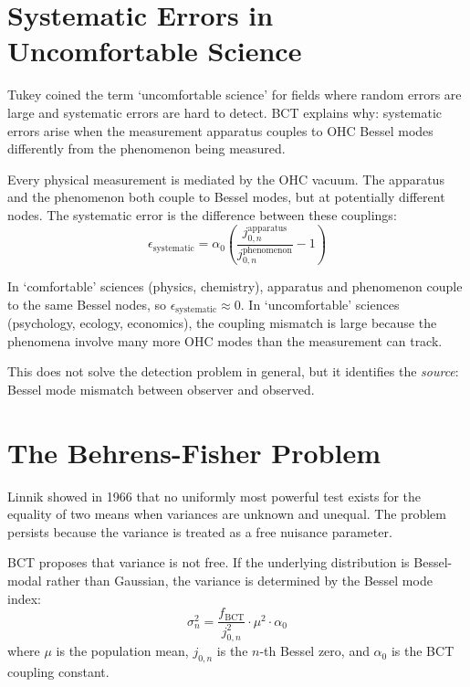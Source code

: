 \documentclass[aps,prl,twocolumn,superscriptaddress]{revtex4-2}
\begin{document}
\section{Systematic Errors in Uncomfortable Science}

Tukey coined the term `uncomfortable science' for fields where random errors are large and systematic errors are hard to detect. BCT explains why: systematic errors arise when the measurement apparatus couples to OHC Bessel modes differently from the phenomenon being measured.

Every physical measurement is mediated by the OHC vacuum. The apparatus and the phenomenon both couple to Bessel modes, but at potentially different nodes. The systematic error is the difference between these couplings:
\begin{equation}
\epsilon_{\mathrm{systematic}} = \alpha_0 \left(\frac{j_{0,n}^{\mathrm{apparatus}}}{j_{0,n}^{\mathrm{phenomenon}}} - 1\right)
\end{equation}

In `comfortable' sciences (physics, chemistry), apparatus and phenomenon couple to the same Bessel nodes, so $\epsilon_{\mathrm{systematic}} \approx 0$. In `uncomfortable' sciences (psychology, ecology, economics), the coupling mismatch is large because the phenomena involve many more OHC modes than the measurement can track.

This does not solve the detection problem in general, but it identifies the \emph{source}: Bessel mode mismatch between observer and observed.

\section{The Behrens-Fisher Problem}

Linnik showed in 1966 that no uniformly most powerful test exists for the equality of two means when variances are unknown and unequal. The problem persists because the variance is treated as a free nuisance parameter.

BCT proposes that variance is not free. If the underlying distribution is Bessel-modal rather than Gaussian, the variance is determined by the Bessel mode index:
\begin{equation}
\sigma^2_n = \frac{f_{\mathrm{BCT}}}{j_{0,n}^2} \cdot \mu^2 \cdot \alpha_0
\end{equation}
where $\mu$ is the population mean, $j_{0,n}$ is the $n$-th Bessel zero, and $\alpha_0$ is the BCT coupling constant.
\end{document}
